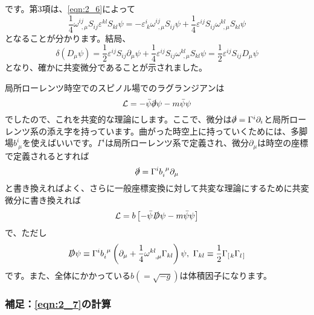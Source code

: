 \documentclass[unicode,a4paper,11pt]{ltjsarticle}
\begin{document}
です。第3項は、\eqref{eqn:2_6}によって
\begin{equation}
   \frac{1}{4}\omega^{ij}_{\ \ ,\mu}S_{ij}\varepsilon^{kl}S_{kl}\psi
   =
   -
   \varepsilon^{i}_{\ k}\omega^{ij}_{\ \ ,\mu}
   S_{ij}\psi
   +
   \frac{1}{4}\varepsilon^{ij}S_{ij}\omega^{kl}_{\ \ ,\mu}S_{kl}\psi
   \label{eqn:2_7}
\end{equation}
となることが分かります。結局、
\begin{equation}
   \delta(D_{\mu}\psi)
   =
   \frac{1}{2}\varepsilon^{ij}S_{ij}\partial_{\mu}\psi
   +
   \frac{1}{4}\varepsilon^{ij}S_{ij}\omega^{kl}_{\ \ ,\mu}S_{kl}\psi
   =
   \frac{1}{2}\varepsilon^{ij}S_{ij}D_{\mu}\psi
\end{equation}
となり、確かに共変微分であることが示されました。

局所ローレンツ時空でのスピノル場でのラグランジアンは
\begin{equation}
   \mathcal{L}
   =
   -
   \bar{\psi}\slashed{\partial}\psi
   -
   m\bar{\psi}\psi
\end{equation}
でしたので、これを共変的な理論にします。ここで、微分は$\slashed
   {\partial}=\Gamma^{i}\partial_{i}$と局所ローレンツ系の添え字を持っています。曲がった時空上に持っていくためには、多脚場$b^{i}_{\ \mu}$を使えばいいです。$\Gamma^{i}$は局所ローレンツ系で定義され、微分$\partial_{\mu}$は時空の座標で定義されるとすれば
\begin{equation}
   \slashed{\partial}
   =
   \Gamma^{i}b^{\ \mu}_{i}\partial_{\mu}
\end{equation}
と書き換えればよく、さらに一般座標変換に対して共変な理論にするために共変微分に書き換えれば
\begin{equation}
   \mathcal{L}
   =
   b
   \left[
      -\bar{\psi}\slashed{D}\psi
      -m\bar{\psi}\psi
      \right]
\end{equation}
で、ただし
\begin{equation}
   \slashed{D}\psi
   \equiv
   \Gamma^{i}b^{\ \mu}_{i}
   \left(
   \partial_{\mu}+\frac{1}{4}\omega^{kl}_{\ \ ,\mu}\Gamma_{kl}
   \right)
   \psi
   ,\
   \Gamma_{kl}
   \equiv
   \frac{1}{2}\Gamma_{\left[\right.k}\Gamma_{l\left.\right]}
\end{equation}
です。また、全体にかかっている$b(=\sqrt{-g})$は体積因子になります。


\subsubsection*{補足：\texorpdfstring{\eqref{eqn:2_7}}{公式}の計算}
\end{document}
